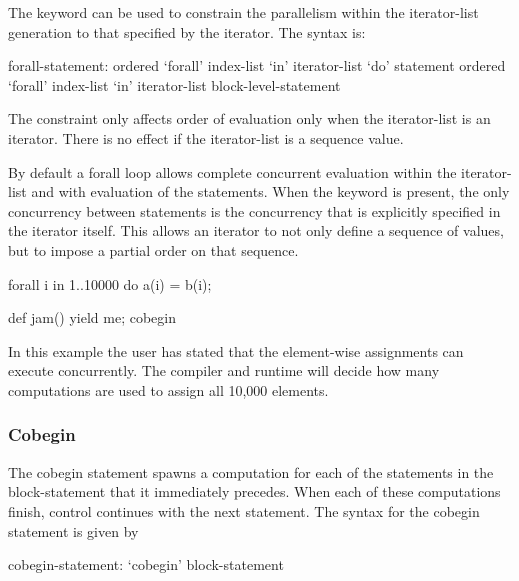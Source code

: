The  keyword can be used to constrain the parallelism
within the iterator-list generation to that specified by the iterator.
The syntax is:
\begin{syntax}
forall-statement:
   ordered `forall' index-list `in' iterator-list `do' statement
   ordered `forall' index-list `in' iterator-list block-level-statement
\end{syntax}

The  constraint only affects order of evaluation only
when the iterator-list is an iterator. There is no effect if the
iterator-list is a sequence value.

By default a forall loop allows complete concurrent evaluation within
the iterator-list and with evaluation of the statements. When
the  keyword is present, the only concurrency between
statements is the concurrency that is explicitly specified in the
iterator itself. This allows an iterator to not only define a sequence of
values, but to impose a partial order on that sequence.


\begin{example}
\begin{chapel}
forall i in 1..10000 do
  a(i) = b(i);

def jam() {
  yield me;
  cobegin {
  }
}
\end{chapel}
In this example the user has stated that the element-wise assignments can
execute concurrently. The compiler and runtime will decide how many
computations are used to assign all 10,000 elements.
\end{example}


\subsubsection{Cobegin}
\label{Cobegin}

The cobegin statement spawns a computation for each of the statements
in the block-statement that it immediately precedes.  When each of
these computations finish, control continues with the next statement.
The syntax for the cobegin statement is given by
\begin{syntax}
cobegin-statement:
  `cobegin' block-statement
\end{syntax}

